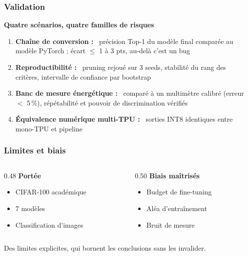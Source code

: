 \documentclass[
	11pt,
]{beamer}
\newcommand{\ititle}[1]{\textbf{#1 :}~}
\begin{document}
\begin{frame}
	\frametitle{Validation}

	\footnotesize
	\vspace{0.3em}
	\textbf{Quatre scénarios, quatre familles de risques}
	\begin{enumerate}
		\item \ititle{Chaîne de conversion} précision Top-1 du modèle
		      final comparée au modèle PyTorch ; écart $\leq$ 1 à 3 pts,
		      au-delà c'est un bug
		\item \ititle{Reproductibilité} pruning rejoué sur 3 seeds,
		      stabilité du rang des critères, intervalle de confiance
		      par bootstrap
		\item \ititle{Banc de mesure énergétique} comparé à un multimètre
		      calibré (erreur $<$ 5\,\%), répétabilité et pouvoir de
		      discrimination vérifiés
		\item \ititle{Équivalence numérique multi-TPU} sorties INT8
		      identiques entre mono-TPU et pipeline
	\end{enumerate}
\end{frame}

\begin{frame}
	\frametitle{Limites et biais}

	\footnotesize
	\vspace{0.4em}
	\begin{columns}[T]
	\begin{column}{0.48\textwidth}
		\textbf{Portée}
		\begin{itemize}
			\item CIFAR-100 académique
			\item 7 modèles
			\item Classification d'images
		\end{itemize}
	\end{column}
	\begin{column}{0.50\textwidth}
		\textbf{Biais maîtrisés}
		\begin{itemize}
			\item Budget de fine-tuning
			\item Aléa d'entraînement
			\item Bruit de mesure
		\end{itemize}
	\end{column}
	\end{columns}

	\vspace{1.0em}
	\begin{center}
	\colorbox{tpulight}{\parbox{0.9\linewidth}{\centering
	\footnotesize Des limites explicites, qui bornent les conclusions
	sans les invalider.}}
	\end{center}
\end{frame}
\end{document}
